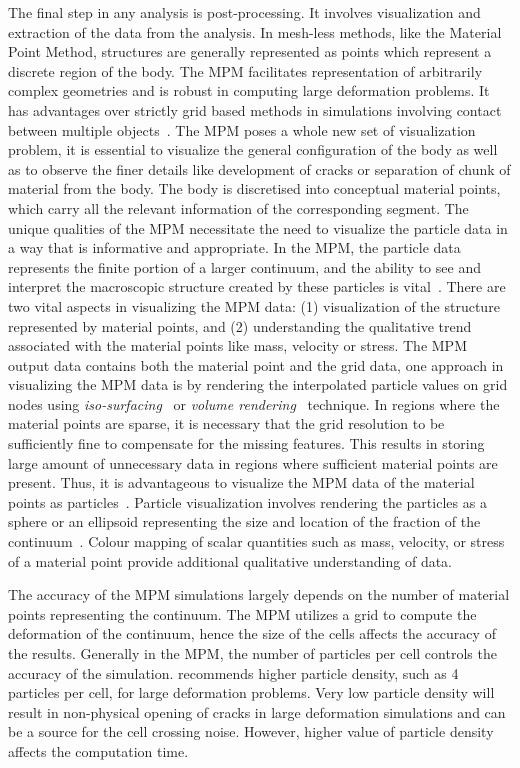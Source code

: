 The final step in any analysis is post-processing. It involves visualization 
and extraction of the data from the analysis. In mesh-less methods, like the 
Material Point Method, structures are generally represented as points which 
represent a discrete region of the body. The MPM facilitates representation of 
arbitrarily complex geometries and is robust in computing large deformation 
problems. It has advantages over strictly grid based methods in simulations 
involving contact between multiple objects~\citep{Bardenhagen2000}. The MPM 
poses a whole new set of visualization problem, it is essential to visualize 
the general configuration of the body as well as to observe the finer details 
like development of cracks or separation of chunk of material from the body. 
The body is discretised into conceptual material points, which carry all the 
relevant information of the corresponding segment. The unique qualities of the 
MPM necessitate the need to visualize the particle data in a way that is 
informative and appropriate. In the MPM, the particle data represents the 
finite portion of a larger continuum, and the ability to see and interpret the 
macroscopic structure created by these particles is vital~\citep{bigler2006}. 
There are two vital aspects in visualizing the MPM data: (1) visualization of 
the structure represented by material points, and (2) understanding the 
qualitative trend associated with the material points like mass, velocity or 
stress. The MPM output data contains both the material point and the grid data, 
one approach in visualizing the MPM data is by rendering the interpolated 
particle values on grid nodes using \textit{iso-surfacing}~\citep{lorensen1987} 
or \textit{volume rendering}~\citep{levoy1988} technique. In regions where the 
material points are sparse, it is necessary that the grid resolution to be 
sufficiently fine to compensate for the missing features. This results in 
storing large amount of unnecessary data in regions where sufficient material 
points are present. Thus, it is advantageous to visualize the MPM data of the 
material points as particles~\citep{bigler2006}. Particle visualization 
involves rendering the particles as a sphere or an ellipsoid representing the 
size and location of the fraction of the 
continuum~\citep{kuester2001,krogh1997,gumhold2003}. Colour mapping of scalar 
quantities such as mass, velocity, or stress of a material point provide 
additional qualitative understanding of data. 

The accuracy of the MPM simulations largely depends on the number of material 
points representing the continuum. The MPM utilizes a grid to compute the 
deformation of the continuum, hence the size of the cells affects the accuracy 
of the results. Generally in the MPM, the number of particles per cell controls 
the accuracy of the simulation. \citet{Guilkey2003} recommends higher particle 
density, such as 4 particles per cell, for large deformation problems. Very low 
particle density will result in non-physical opening of cracks in large 
deformation simulations and can be a source for the cell crossing noise. 
However, higher value of particle density affects the computation time. 

